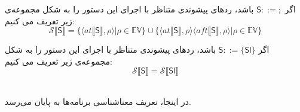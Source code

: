 \begin{defn}
	اگر $         \mathsf{S} ::=;  $ باشد، ردهای پیشوندی متناظر با اجرای این دستور را به شکل مجموعه‌ی زیر تعریف می کنیم:
	$$\mathcal{S} \llbracket\mathsf{S}\rrbracket = \{ \langle at\llbracket\mathsf{S}\rrbracket , \rho \rangle | \rho \in \mathbb{EV}       \} \cup     \{ \langle at\llbracket\mathsf{S}\rrbracket , \rho \rangle \langle aft\llbracket\mathsf{S}\rrbracket , \rho \rangle | \rho \in \mathbb{EV}       \}             $$  
	
	
	اگر $         \mathsf{S} ::=\{\mathsf{Sl}\}  $ باشد، ردهای پیشوندی متناظر با اجرای این دستور را به شکل مجموعه‌ی زیر تعریف می کنیم:
	$$\mathcal{S} \llbracket\mathsf{S}\rrbracket = \mathcal{S} \llbracket\mathsf{Sl}\rrbracket $$   \\
\end{defn}
در اینجا، تعریف معناشناسی برنامه‌ها به پایان می‌رسد.

